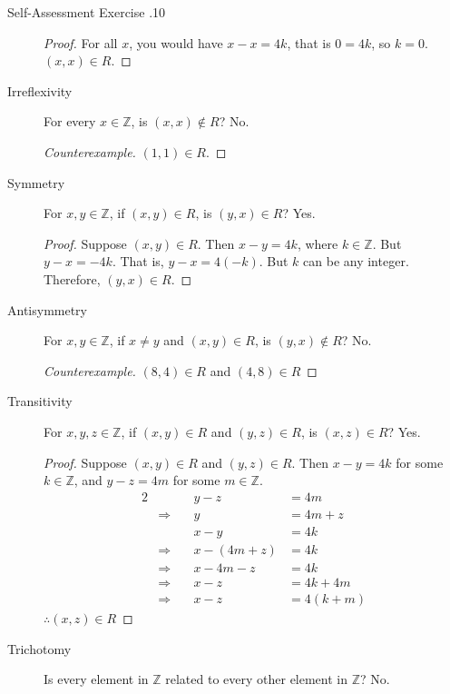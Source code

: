 \documentclass[\main/notes.tex]{subfiles}
\begin{document}
\begin{exercise}{Self-Assessment Exercise \thechapter.10}
\begin{questions}
\begin{questions}
\begin{answer}
\begin{description}
\begin{proof}
													For all $x$, you would have $x - x = 4k$, that is $0 = 4k$, so $k = 0$. $(x, x) \in R$.
												\end{proof}
											\item[Irreflexivity] For every $x \in \mathbb{Z}$, is $(x, x) \notin R$? No.
												\begin{proof}[Counterexample]
													$(1, 1) \in R$.
												\end{proof}
											\item[Symmetry] For $x, y \in \mathbb{Z}$, if $(x, y) \in R$, is $(y, x) \in R$? Yes.
												\begin{proof}
													Suppose $(x, y) \in R$. Then $x - y = 4k$, where $k \in \mathbb{Z}$. But $y - x = -4k$. That is, $y - x = 4(-k)$. But $k$ can be any integer. Therefore, $(y, x) \in R$.
												\end{proof}
											\item[Antisymmetry] For $x, y \in \mathbb{Z}$, if $x \neq y$ and $(x, y) \in R$, is $(y, x) \notin R$? No.
												\begin{proof}[Counterexample]
													$(8, 4) \in R$ and $(4, 8) \in R$
												\end{proof}
											\item[Transitivity] For $x, y, z \in \mathbb{Z}$, if $(x, y) \in R$ and $(y, z) \in R$, is $(x, z) \in R$? Yes.
												\begin{proof}
													Suppose $(x, y) \in R$ and $(y, z) \in R$. Then $x - y = 4k$ for some $k \in \mathbb{Z}$, and $y - z = 4m$ for some $m \in \mathbb{Z}$.
													\begin{alignat*}{2}
														&\qquad & y - z &= 4m\\
														& \Rightarrow \quad&y &= 4m + z\\
														& \quad &x - y &= 4k\\
														& \Rightarrow \quad &x - (4m + z) &= 4k\\
														& \Rightarrow \quad &x - 4m - z &= 4k\\
														& \Rightarrow \quad &x - z &= 4k + 4m\\
														& \Rightarrow \quad &x - z &= 4(k + m)
													\end{alignat*}
													$\therefore (x, z) \in R$ 
												\end{proof}
											\item[Trichotomy] Is every element in $\mathbb{Z}$ related to every other element in $\mathbb{Z}$? No.

\end{description}
\end{answer}
\end{questions}
\end{questions}
\end{exercise}
\end{document}
